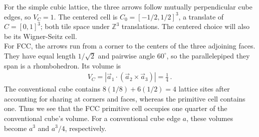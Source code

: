 \documentclass[11pt, oneside]{book}
\makeatletter
\newenvironment{latticefigure}
  {\par\addvspace{\intextsep}\noindent\begin{minipage}{\linewidth}\def\@captype{figure}}
  {\end{minipage}\par\addvspace{\intextsep}}
\theoremstyle{break}
\theoremstyle{break}
\newcommand{\Z}{\mathbb{Z}}
\makeatother
\begin{document}
\begin{latticefigure}
\begin{minipage}[t]{0.49\textwidth}
\end{minipage}
\caption{Primitive cells of the simple cubic and face-centered cubic lattices. Green dots are lattice sites and black arrows are the primitive vectors. (a) The simple cubic cell $C$ is the unit cube; the dashed cube $C_0$ is the Wigner-Seitz primitive cell centered at the origin. (b) The FCC conventional cube is drawn in brown, with a primitive rhombohedron $C$ outlined in blue.}
\label{fig:cubic-cells}
\end{latticefigure}

For the simple cubic lattice, the three arrows follow mutually perpendicular cube edges, so $V_C=1$. The centered cell is $C_0=[-1/2,1/2]^3$, a translate of $C=[0,1]^3$; both tile space under $\Z^3$ translations. The centered choice will also be its Wigner-Seitz cell. \\

For FCC, the arrows run from a corner to the centers of the three adjoining faces. They have equal length $1/\sqrt{2}$ and pairwise angle $60^\circ$, so the parallelepiped they span is a rhombohedron. Its volume is
\begin{align*}
V_C=\left|\vec a_1\cdot(\vec a_2\times\vec a_3)\right|=\frac14\,.
\end{align*}
The conventional cube contains $8(1/8)+6(1/2)=4$ lattice sites after accounting for sharing at corners and faces, whereas the primitive cell contains one. Thus we see that the FCC primitive cell occupies one quarter of the conventional cube's volume. For a conventional cube edge $a$, these volumes become $a^3$ and $a^3/4$, respectively. \\
\end{document}
